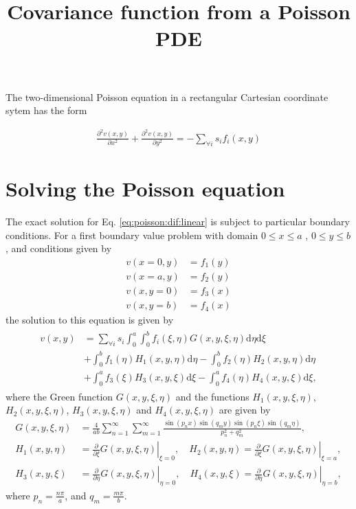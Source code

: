 \documentclass[a4paper,10pt]{article}
\title{Covariance function from a Poisson PDE}
\author{}
\date{}
\newcommand{\dif}{\textrm{d}}
\begin{document}
\maketitle

The two-dimensional Poisson equation in a rectangular Cartesian
coordinate sytem has the form

\begin{align}\label{eq:poisson:dif:linear}
\frac{\partial^2 v(x,y)}{\partial x^2} +  \frac{\partial^2 v(x,y)}{\partial y^2} = -\sum_{\forall i} s_{i}f_i(x,y)
\end{align}

\section{Solving the Poisson equation}

The exact solution for Eq. \eqref{eq:poisson:dif:linear} is subject to
particular boundary conditions. For a first boundary value
problem with domain 
$0\leq x\leq a$ , $0\leq y\leq b$, and conditions given by
\begin{align*}
v(x=0, y) &= f_1(y)\\
v(x=a,y) &= f_2(y) \\
v(x,y=0) &= f_3(x) \\
v(x,y=b) &= f_4(x)
\end{align*}
the solution to this equation is given by \cite{Polyanin:Handbook02}
\begin{align}\label{eq:sol:poisson:dif:linear}
\begin{split}
v(x,y)&=\sum_{\forall i}s_{i} \int_{0}^{a}\int_{0}^{b}f_i(\xi,\eta)G(x, y,\xi,\eta)\dif{\eta}\dif{\xi}\\
      &+ \int_0^bf_1(\eta)H_1(x, y, \eta)\dif\eta
      -\int_0^bf_2(\eta)H_2(x, y, \eta)\dif\eta \\
 &+ \int_0^af_3(\xi)H_3(x, y, \xi)\dif\xi -\int_0^af_4(\eta)H_4(x, y, \xi)\dif\xi,
\end{split}
\end{align}
where the Green function $G(x, y,\xi,\eta)$ and the functions $H_1(x,
y,\xi,\eta)$, $H_2(x, y,\xi,\eta)$, $H_3(x, y,\xi,\eta)$ and $H_4(x, y,\xi,\eta)$ are given by
\begin{align}\label{eq:green:function}
G(x, y,\xi,\eta)&=\frac{4}{ab}\sum_{n=1}^\infty
                  \sum_{m=1}^\infty\frac{\sin\left({p_n x}\right)
\sin\left(q_m y\right)\sin\left(p_n \xi\right)\sin\left(q_m \eta\right)}{p_n^2 + q_m^2},\\
H_1(x, y,\eta)& =
                         \left.\frac{\partial}{\partial\xi}G(x, y, \xi,\eta)\right|_{\xi=0},\quad 
H_2(x, y,\eta) = \left.\frac{\partial}{\partial\xi}G(x, y,
                    \xi,\eta)\right|_{\xi=a}\nonumber,\\
H_3(x, y,\xi)& =
                         \left.\frac{\partial}{\partial\eta}G(x, y, \xi,\eta)\right|_{\eta=0},\quad 
H_4(x, y,\xi) = \left.\frac{\partial}{\partial\eta}G(x, y, \xi,\eta)\right|_{\eta=b}\nonumber,
\end{align}
where $p_n=\frac{n\pi}{a}$, and $q_m=\frac{m\pi}{b}$.
\end{document}
